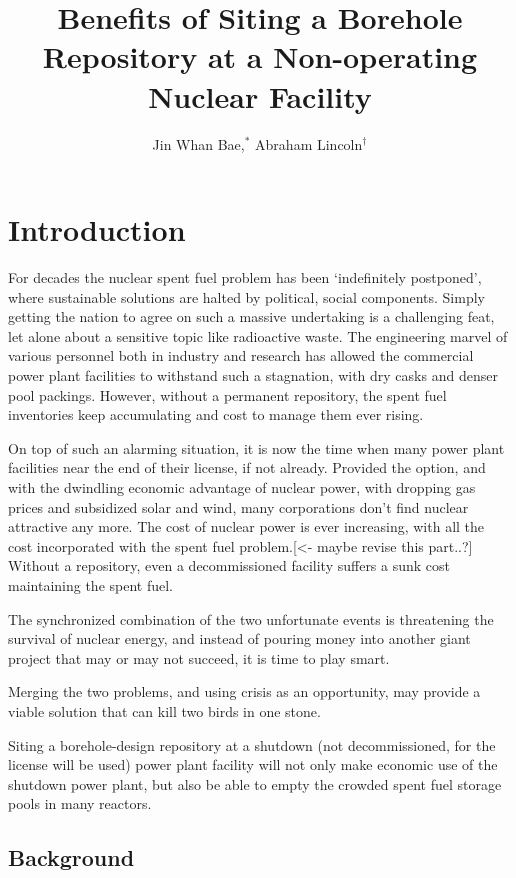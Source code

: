 \documentclass{anstrans}
\title{Benefits of Siting a Borehole Repository at a Non-operating Nuclear 
Facility}
\author{Jin Whan Bae,$^{*}$ Abraham Lincoln$^{\dagger}$}
\institute{
$^{*}$Dept. of Nuclear Plasma, and Radiological Engineering, University of Illinois at Urbana-Champaign, Urbana, IL
\and
$^{\dagger}$State Capitol Building, Springfield, IL
}
\begin{document}
\section{Introduction}

For decades the nuclear spent fuel problem has been `indefinitely postponed', 
where sustainable solutions are halted by political, social components. Simply 
getting the nation to agree on such a massive undertaking is a challenging 
feat, let alone about a sensitive topic like radioactive waste. The engineering 
marvel of various personnel both in industry and research has allowed the 
commercial power plant facilities to withstand such a stagnation, with dry 
casks and denser pool packings. However, without a permanent repository, the 
spent fuel inventories keep accumulating and cost to manage them ever rising.

On top of such an alarming situation, it is now the time when many power plant 
facilities near the end of their license, if not already. Provided the option, 
and with the dwindling economic advantage of nuclear power, with dropping gas 
prices and subsidized solar and wind, many corporations don't find nuclear 
attractive any more. The cost of nuclear power is ever increasing, with all the 
cost incorporated with the spent fuel problem.[<- maybe revise this part..?]  
Without a repository, even a decommissioned facility suffers a sunk cost 
maintaining the spent fuel.

The synchronized combination of the two unfortunate events is threatening the 
survival of nuclear energy, and instead of pouring money into another giant 
project that may or may not succeed, it is time to play smart.

Merging the two problems, and using crisis as an opportunity, may provide a 
viable solution that can kill two birds in one stone.

Siting a borehole-design repository at a shutdown (not decommissioned, for the 
license will be used) power plant facility will not only make economic use of 
the shutdown power plant, but also be able to empty the crowded spent fuel 
storage pools in many reactors.


\subsection{Background}
\end{document}
